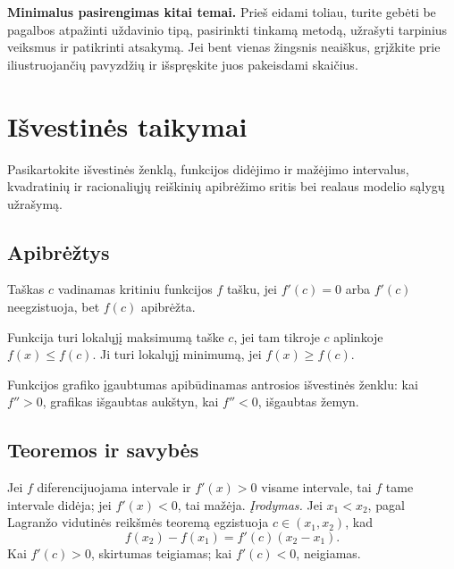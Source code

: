\textbf{Minimalus pasirengimas kitai temai.} Prieš eidami toliau, turite gebėti be pagalbos atpažinti uždavinio tipą, pasirinkti tinkamą metodą, užrašyti tarpinius veiksmus ir patikrinti atsakymą. Jei bent vienas žingsnis neaiškus, grįžkite prie iliustruojančių pavyzdžių ir išspręskite juos pakeisdami skaičius.

\section{Išvestinės taikymai}\label{sec:isvestines-taikymai}

\begin{tcolorbox}[title=Prieš pradedant, colback=green!5]
Pasikartokite išvestinės ženklą, funkcijos didėjimo ir mažėjimo intervalus, kvadratinių ir racionaliųjų reiškinių apibrėžimo sritis bei realaus modelio sąlygų užrašymą.
\end{tcolorbox}
\subsection{Apibrėžtys}

\begin{apibreztis}
Taškas $c$ vadinamas kritiniu funkcijos $f$ tašku, jei $f'(c)=0$ arba $f'(c)$ neegzistuoja, bet $f(c)$ apibrėžta.
\end{apibreztis}

\begin{apibreztis}
Funkcija turi lokalųjį maksimumą taške $c$, jei tam tikroje $c$ aplinkoje $f(x)\le f(c)$. Ji turi lokalųjį minimumą, jei $f(x)\ge f(c)$.
\end{apibreztis}

\begin{apibreztis}
Funkcijos grafiko įgaubtumas apibūdinamas antrosios išvestinės ženklu: kai $f''>0$, grafikas išgaubtas aukštyn, kai $f''<0$, išgaubtas žemyn.
\end{apibreztis}

\subsection{Teoremos ir savybės}

\begin{teorema}
Jei $f$ diferencijuojama intervale ir $f'(x)>0$ visame intervale, tai $f$ tame intervale didėja; jei $f'(x)<0$, tai mažėja.
\emph{Įrodymas.} Jei $x_1<x_2$, pagal Lagranžo vidutinės reikšmės teoremą egzistuoja $c\in(x_1,x_2)$, kad
\[
f(x_2)-f(x_1)=f'(c)(x_2-x_1).
\]
Kai $f'(c)>0$, skirtumas teigiamas; kai $f'(c)<0$, neigiamas.
\end{teorema}

